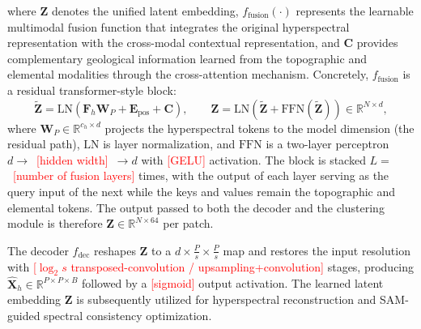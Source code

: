 \documentclass[pdflatex,sn-mathphys-num]{sn-jnl}
\newcommand{\fillin}[1]{\textcolor{red}{[#1]}}
\begin{document}
where $\mathbf{Z}$ denotes the unified latent embedding, $f_{\mathrm{fusion}}(\cdot)$ represents the learnable multimodal fusion function that integrates the original hyperspectral representation with the cross-modal contextual representation, and $\mathbf{C}$ provides complementary geological information learned from the topographic and elemental modalities through the cross-attention mechanism. Concretely, $f_{\mathrm{fusion}}$ is a residual transformer-style block:
\[
\tilde{\mathbf{Z}}=\mathrm{LN}\!\left(\mathbf{F}_h\mathbf{W}_{P}+\mathbf{E}_{\mathrm{pos}}+\mathbf{C}\right),
\qquad
\mathbf{Z}=\mathrm{LN}\!\left(\tilde{\mathbf{Z}}+\mathrm{FFN}(\tilde{\mathbf{Z}})\right)\in\mathbb{R}^{N\times d},
\]
where $\mathbf{W}_P\in\mathbb{R}^{c_h\times d}$ projects the hyperspectral tokens to the model dimension (the residual path), $\mathrm{LN}$ is layer normalization, and $\mathrm{FFN}$ is a two-layer perceptron $d\rightarrow$~\fillin{hidden width}~$\rightarrow d$ with \fillin{GELU} activation. The block is stacked $L=$~\fillin{number of fusion layers} times, with the output of each layer serving as the query input of the next while the keys and values remain the topographic and elemental tokens. The output passed to both the decoder and the clustering module is therefore $\mathbf{Z}\in\mathbb{R}^{N\times 64}$ per patch.

The decoder $f_{\mathrm{dec}}$ reshapes $\mathbf{Z}$ to a $d\times\frac{P}{s}\times\frac{P}{s}$ map and restores the input resolution with \fillin{$\log_2 s$ transposed-convolution / upsampling+convolution} stages, producing $\hat{\mathbf{X}}_h\in\mathbb{R}^{P\times P\times B}$ followed by a \fillin{sigmoid} output activation. The learned latent embedding $\mathbf{Z}$ is subsequently utilized for hyperspectral reconstruction and SAM-guided spectral consistency optimization.
\end{document}

